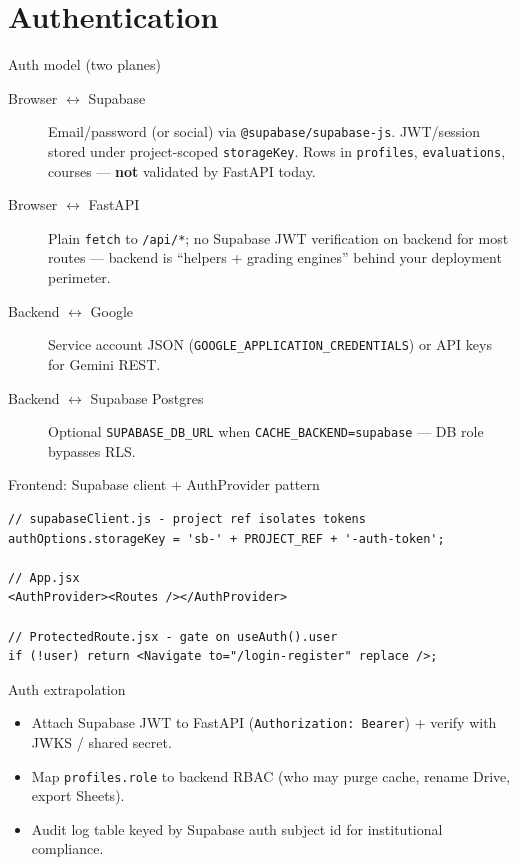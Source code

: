 \documentclass[aspectratio=169]{beamer}
\begin{document}
\section{Authentication}

\begin{frame}{Auth model (two planes)}
  \small
  \begin{description}
    \item[Browser $\leftrightarrow$ Supabase] Email/password (or social) via \texttt{@supabase/supabase-js}. JWT/session stored under project-scoped \texttt{storageKey}. Rows in \texttt{profiles}, \texttt{evaluations}, courses --- \textbf{not} validated by FastAPI today.
    \item[Browser $\leftrightarrow$ FastAPI] Plain \texttt{fetch} to \texttt{/api/*}; no Supabase JWT verification on backend for most routes --- backend is ``helpers + grading engines'' behind your deployment perimeter.
    \item[Backend $\leftrightarrow$ Google] Service account JSON (\texttt{GOOGLE\_APPLICATION\_CREDENTIALS}) or API keys for Gemini REST.
    \item[Backend $\leftrightarrow$ Supabase Postgres] Optional \texttt{SUPABASE\_DB\_URL} when \texttt{CACHE\_BACKEND=supabase} --- DB role bypasses RLS.
  \end{description}
\end{frame}

\begin{frame}[fragile]{Frontend: Supabase client + AuthProvider pattern}
\begin{lstlisting}[style=jsx]
// supabaseClient.js - project ref isolates tokens
authOptions.storageKey = 'sb-' + PROJECT_REF + '-auth-token';

// App.jsx
<AuthProvider><Routes /></AuthProvider>

// ProtectedRoute.jsx - gate on useAuth().user
if (!user) return <Navigate to="/login-register" replace />;
\end{lstlisting}
\end{frame}

\begin{frame}{Auth extrapolation}
  \small
  \begin{itemize}
    \item Attach Supabase JWT to FastAPI (\texttt{Authorization: Bearer}) + verify with JWKS / shared secret.
    \item Map \texttt{profiles.role} to backend RBAC (who may purge cache, rename Drive, export Sheets).
    \item Audit log table keyed by Supabase auth subject id for institutional compliance.
  \end{itemize}
\end{frame}
\end{document}
